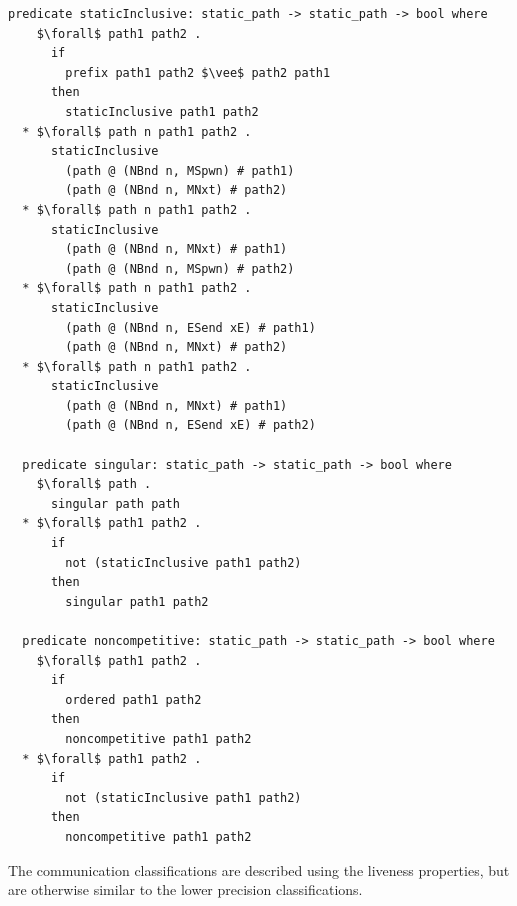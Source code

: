 \documentclass[letterpaper, 11pt]{extarticle}
\begin{document}
\begin{lstlisting}[language=logic, mathescape]
  predicate staticInclusive: static_path -> static_path -> bool where
    $\forall$ path1 path2 .
      if
        prefix path1 path2 $\vee$ path2 path1
      then
        staticInclusive path1 path2
  * $\forall$ path n path1 path2 .
      staticInclusive
        (path @ (NBnd n, MSpwn) # path1)
        (path @ (NBnd n, MNxt) # path2)
  * $\forall$ path n path1 path2 .
      staticInclusive
        (path @ (NBnd n, MNxt) # path1)
        (path @ (NBnd n, MSpwn) # path2)
  * $\forall$ path n path1 path2 .
      staticInclusive
        (path @ (NBnd n, ESend xE) # path1)
        (path @ (NBnd n, MNxt) # path2)
  * $\forall$ path n path1 path2 .
      staticInclusive
        (path @ (NBnd n, MNxt) # path1)
        (path @ (NBnd n, ESend xE) # path2)

  predicate singular: static_path -> static_path -> bool where
    $\forall$ path .
      singular path path
  * $\forall$ path1 path2 .
      if
        not (staticInclusive path1 path2)
      then
        singular path1 path2

  predicate noncompetitive: static_path -> static_path -> bool where
    $\forall$ path1 path2 . 
      if
        ordered path1 path2
      then
        noncompetitive path1 path2
  * $\forall$ path1 path2 .
      if
        not (staticInclusive path1 path2)
      then
        noncompetitive path1 path2
  \end{lstlisting}

The communication classifications are described using the liveness properties, but
are otherwise similar to the lower precision classifications.
\end{document}
